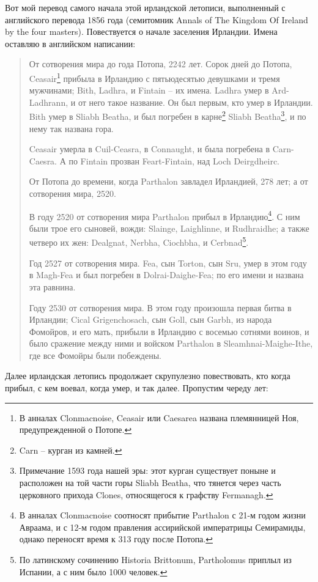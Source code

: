 Вот мой перевод самого начала этой ирландской летописи, выполненный с английского перевода 1856 года (семитомник Annals of The Kingdom Of Ireland by the four masters)\cite{annals4mast}. Повествуется о начале заселения Ирландии. Имена оставляю в английском написании:

\begin{quotation}
От сотворения мира до года Потопа, 2242 лет. Сорок дней до Потопа, Ceasair\footnote{В анналах Clonmacnoise, Ceasair или Caesarea названа племянницей Ноя, предупрежденной о Потопе.} прибыла в Ирландию с пятьюдесятью девушками и тремя мужчинами; Bith, Ladhra, и Fintain – их имена. Ladhra умер в Ard-Ladhrann, и от него такое название. Он был первым, кто умер в Ирландии. Bith умер в Sliabh Beatha, и был погребен в карне\footnote{Carn – курган из камней.} Sliabh Beatha\footnote{Примечание 1593 года нашей эры: этот курган существует поныне и расположен на той части горы Sliabh Beatha, что тянется через часть церковного прихода Clones, относящегося к графству Fermanagh.}, и по нему так названа гора. 

Ceasair умерла в Cuil-Ceasra, в Connaught, и была погребена в Carn-Caesra. А по Fintain прозван Feart-Fintain, над Loch Deirgdheirc.

От Потопа до времени, когда Parthalon завладел Ирландией, 278 лет; а от сотворения мира, 2520.

В году 2520 от сотворения мира Parthalon прибыл в Ирландию\footnote{В анналах Clonmacnoise соотносят прибытие Parthalon с 21-м годом жизни Авраама, и с 12-м годом правления ассирийской императрицы Семирамиды, однако переносят время к 313 году после Потопа.}. С ним были трое его сыновей, вожди: Slainge, Laighlinne, и Rudhraidhe; а также четверо их жен: Dealgnat, Nerbha, Cioch\-bha, и Cerbnad\footnote{По латинскому сочинению Historia Brittonum, Partholomus приплыл из Испании, а с ним было 1000 человек.}.

Год 2527 от сотворения мира. Fea, сын Torton, сын Sru, умер в этом году в Magh-Fea и был погребен в Dolrai-Daighe-Fea; по его имени и названа эта равнина.

Году 2530 от сотворения мира. В этом году произошла первая битва в Ирландии; Cical Grigenchosach, сын Goll, сын Garbh, из народа Фомойров, и его мать, прибыли в Ирландию с восемью сотнями воинов, и было сражение между ними и войском Parthalon в Sleamhnai-Maighe-Ithe, где все Фомойры были побеждены.
\end{quotation}

Далее ирландская летопись продолжает скрупулезно повествовать, кто когда прибыл, с кем воевал, когда умер, и так далее. Пропустим череду лет:

